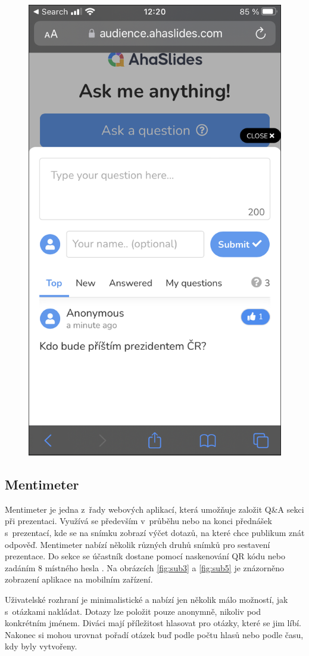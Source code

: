 \begin{figure}
\begin{minipage}{.5\textwidth}
  \includegraphics[width=.7\linewidth]{obrazky/aha_client.png}
  \label{fig:sub6}
\end{minipage}
\end{figure}

\subsection{Mentimeter}
Mentimeter je jedna z~řady webových aplikací, která umožňuje založit Q\&A sekci při prezentaci. Využívá se především v~průběhu nebo na konci přednášek s~prezentací, kde se na snímku zobrazí výčet dotazů, na které chce publikum znát odpověď. Mentimeter nabízí několik různých druhů snímků pro sestavení prezentace. Do sekce se účastník dostane pomocí naskenování QR kódu nebo zadáním 8 místného hesla \cite{mentimetersection}. Na obrázcích \ref{fig:sub3} a \ref{fig:sub5} je znázorněno zobrazení aplikace na mobilním zařízení. 

Uživatelské rozhraní je minimalistické a nabízí jen několik málo možností, jak s~otázkami nakládat. Dotazy lze položit pouze anonymně, nikoliv pod konkrétním jménem. 
Diváci mají příležitost hlasovat pro otázky, které se jim líbí. Nakonec si mohou urovnat pořadí otázek buď podle počtu hlasů nebo podle času, kdy byly vytvořeny.

